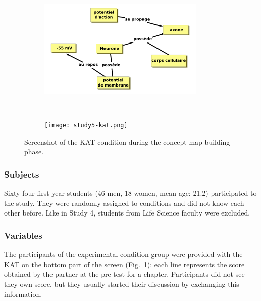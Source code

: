 \documentclass[natbib]{svjour3}
\begin{document}
\begin{figure}[h!t]
        \centering
        \begin{subfigure}{.6\textwidth}
            \includegraphics[width=\linewidth]{study5-conceptmap.png}
        \end{subfigure} \\
        \begin{subfigure}{.7\textwidth}
            \texttt{[image: study5-kat.png]}
        \end{subfigure}
        \caption{Screenshot of the KAT condition during the concept-map building
        phase.}
        \label{study5:kat}
\end{figure}

\subsubsection*{Subjects}
Sixty-four first year students (46 men, 18 women, mean age: 21.2)
participated to the study. They were randomly assigned to conditions and
did not know each other before. Like in Study 4, students from Life Science
faculty were excluded.

\subsubsection*{Variables}

The participants of the experimental condition group were provided with the KAT
on the bottom part of the screen (Fig.~\ref{study5:kat}): each line represents
the score obtained by the partner at the pre-test for a chapter. Participants
did not see they own score, but they usually started their discussion by
exchanging this information.
\end{document}
